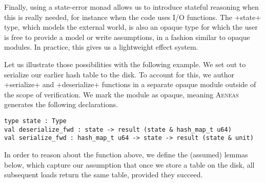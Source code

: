 \documentclass[acmsmall,screen]{acmart}
\newif\iflong
\newif\ifshort
\newcommand{\aeneas}{\textsc{Aeneas}\xspace}
\begin{document}
Finally, using a state-error monad allows us to introduce stateful reasoning when this is really
needed, for instance when the code uses I/O functions. The \li+state+ type, which models the external world,
is also an opaque type for which the user is free to provide a model or write assumptions, in a
fashion similar to opaque modules. In practice,
this gives us a lightweight effect system.

Let us illustrate those possibilities with the following example.
\fi
We set out to serialize our earlier hash table to the
disk. To account for this, we author \li+serialize+ and \li+deserialize+
functions in a separate opaque module outside of the scope of verification.
We
mark the module as opaque, meaning \aeneas generates the following
declarations.
\iflong
First, \li+insert_on_disk+, below, simply loads the map from the
disk, inserts a new entry, and stores the updated table back on disk.

\begin{verbatim}
fn insert_on_disk(key: Key, value: u64) {
    let mut hm = deserialize();
    hm.insert(key, value);
    serialize(hm); }
\end{verbatim}
\aeneas generates the following declarations to model the disk state and the
serialization and deserialization functions.
\fi
\begin{verbatim}
type state : Type
val deserialize_fwd : state -> result (state & hash_map_t u64)
val serialize_fwd : hash_map_t u64 -> state -> result (state & unit)
\end{verbatim}
\iflong
Those definitions generate the following translation of \li+insert_on_disk+:
\begin{verbatim}
let insert_on_disk_fwd (key : usize) (value : u64) : state -> result (state & unit) =
  hm <-- hashmap_utils_deserialize_fwd;
  hm <-- hash_map_insert_fwd_back u64 hm key value;
  _ <-- hashmap_utils_serialize_fwd hm;
  return ()
\end{verbatim}
\fi
\ifshort
We then hand-write salient lemmas about the two functions, e.g. serialization is
the inverse of parsing; because our monad now talks about the outside state, we can
precisely model the interaction of our parser/serializers with the outside
world.
\fi

\iflong
In order to reason about the function above, we define the (assumed) lemmas below,
which capture our assumption that once we store a table on the disk, all subsequent loads return
the same table, provided they succeed.
\end{document}
